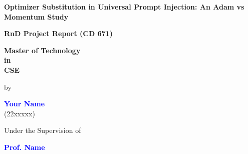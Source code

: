 \documentclass[12pt,a4paper]{report}
\begin{document}
\begin{titlepage}
\begin{center}


{{\Large \textbf{Optimizer Substitution in Universal Prompt Injection: An Adam vs Momentum Study}\par}}
\vspace{1cm}

\vspace{0.4cm}
{
\textbf{\large RnD Project Report (CD 671)} \par}
\vspace{0.2cm}

\vspace{0.5cm}
{
\textbf{\large Master of Technology\\ \vspace{1mm} in\\ \vspace{1mm} CSE} \par}
\vspace{2mm}

\vspace{5mm}
{\large by\par}
\vspace{0.05cm}
{\large \textbf{\textcolor{blue}{Your Name}} \\ (22xxxxx)\par}
\vspace{0.4cm}

{ Under the Supervision of \par}
{\large \textbf{\textcolor{blue}{Prof. Name}}\par}
\vspace{0.8 cm}


\end{center}
\end{titlepage}
\end{document}
